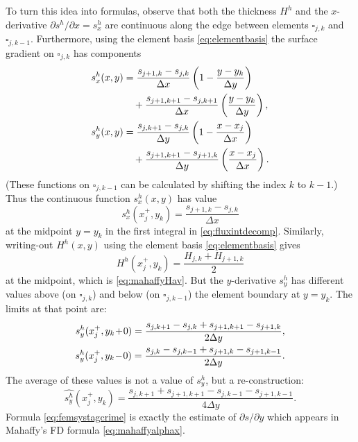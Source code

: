 \documentclass[twocolumn,letterpaper]{igs}
\begin{document}
To turn this idea into formulas, observe that both the thickness $H^h$ and the $x$-derivative $\partial s^h/\partial x = s^h_x$ are continuous along the edge between elements $\square_{j,k}$ and $\square_{j,k-1}$.  Furthermore, using the element basis \eqref{eq:elementbasis} the surface gradient on $\square_{j,k}$ has components
\begin{align}
s^h_x(x,y) &= \frac{s_{j+1,k}-s_{j,k}}{\Delta x} \left(1-\frac{y-y_k}{\Delta y}\right)  \label{eq:grads} \\
   &\quad + \frac{s_{j+1,k+1}-s_{j,k+1}}{\Delta x} \left(\frac{y-y_k}{\Delta y}\right), \notag \\
s^h_y(x,y) &= \frac{s_{j,k+1}-s_{j,k}}{\Delta y} \left(1-\frac{x-x_j}{\Delta x}\right) \notag \\
   &\quad + \frac{s_{j+1,k+1}-s_{j+1,k}}{\Delta y} \left(\frac{x-x_j}{\Delta x}\right). \notag
\end{align}
(These functions on $\square_{j,k-1}$ can be calculated by shifting the index $k$ to $k-1$.)  Thus the continuous function $s^h_x(x,y)$ has value
\begin{equation}
s^h_x(x_j^+,y_k) = \frac{s_{j+1,k}-s_{j,k}}{\Delta x} \label{eq:femsxstag}
\end{equation}
at the midpoint $y=y_k$ in the first integral in \eqref{eq:fluxintdecomp}.  Similarly, writing-out $H^h(x,y)$ using the element basis \eqref{eq:elementbasis} gives
\begin{equation}
H^h(x_j^+,y_k) = \frac{H_{j,k}+H_{j+1,k}}{2} \label{eq:femHstag}
\end{equation}
at the midpoint, which is \eqref{eq:mahaffyHav}.  But the $y$-derivative $s^h_y$ has different values above (on $\square_{j,k}$) and below (on $\square_{j,k-1}$) the element boundary at $y = y_k$.  The limits at that point are:
\begin{align}
s^h_y(x_j^+,y_k\!+\!0) = \frac{s_{j,k+1}-s_{j,k} + s_{j+1,k+1}-s_{j+1,k}}{2\Delta y}, \\
s^h_y(x_j^+,y_k\!-\!0) = \frac{s_{j,k}-s_{j,k-1} + s_{j+1,k}-s_{j+1,k-1}}{2\Delta y}. \notag
\end{align}
The average of these values is not a value of $s_y^h$, but a re-construction:
\begin{equation}
\widehat{s^h_y}(x_j^+,y_k) = \frac{s_{j,k+1} + s_{j+1,k+1} - s_{j,k-1} - s_{j+1,k-1}}{4\Delta y}. \label{eq:femsystagcrime}
\end{equation}
Formula \eqref{eq:femsystagcrime} is exactly the estimate of $\partial s/\partial y$ which appears in Mahaffy's FD formula \eqref{eq:mahaffyalphax}.
\end{document}
